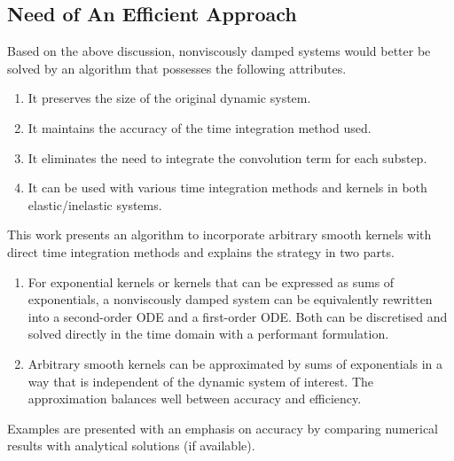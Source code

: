 \subsection{Need of An Efficient Approach}
Based on the above discussion, nonviscously damped systems would better be solved by an algorithm that possesses the following attributes.
\begin{Objective}
\begin{enumerate}
\item It preserves the size of the original dynamic system.
\item It maintains the accuracy of the time integration method used.
\item It eliminates the need to integrate the convolution term for each substep.
\item It can be used with various time integration methods and kernels in both elastic/inelastic systems.
\end{enumerate}
\end{Objective}

This work presents an algorithm to incorporate arbitrary smooth kernels with direct time integration methods and explains the strategy in two parts.
\begin{enumerate}
\item For exponential kernels or kernels that can be expressed as sums of exponentials, a nonviscously damped system can be equivalently rewritten into a second-order ODE and a first-order ODE. Both can be discretised and solved directly in the time domain with a performant formulation.
\item Arbitrary smooth kernels can be approximated by sums of exponentials in a way that is independent of the dynamic system of interest. The approximation balances well between accuracy and efficiency.
\end{enumerate}
Examples are presented with an emphasis on accuracy by comparing numerical results with analytical solutions (if available).
